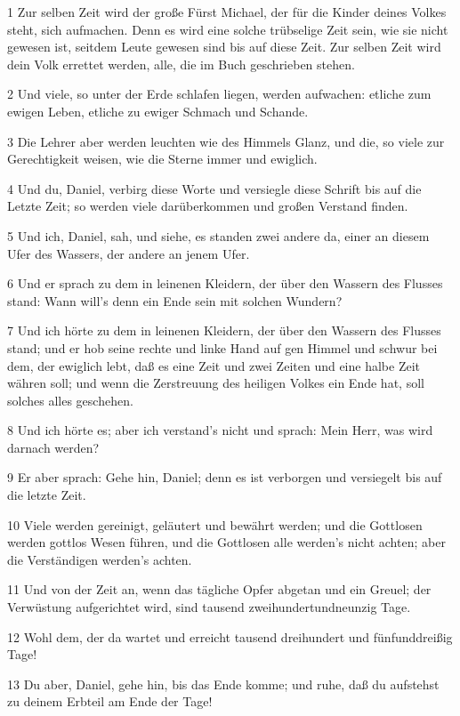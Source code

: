 \par 1 Zur selben Zeit wird der große Fürst Michael, der für die Kinder deines Volkes steht, sich aufmachen. Denn es wird eine solche trübselige Zeit sein, wie sie nicht gewesen ist, seitdem Leute gewesen sind bis auf diese Zeit. Zur selben Zeit wird dein Volk errettet werden, alle, die im Buch geschrieben stehen.
\par 2 Und viele, so unter der Erde schlafen liegen, werden aufwachen: etliche zum ewigen Leben, etliche zu ewiger Schmach und Schande.
\par 3 Die Lehrer aber werden leuchten wie des Himmels Glanz, und die, so viele zur Gerechtigkeit weisen, wie die Sterne immer und ewiglich.
\par 4 Und du, Daniel, verbirg diese Worte und versiegle diese Schrift bis auf die Letzte Zeit; so werden viele darüberkommen und großen Verstand finden.
\par 5 Und ich, Daniel, sah, und siehe, es standen zwei andere da, einer an diesem Ufer des Wassers, der andere an jenem Ufer.
\par 6 Und er sprach zu dem in leinenen Kleidern, der über den Wassern des Flusses stand: Wann will's denn ein Ende sein mit solchen Wundern?
\par 7 Und ich hörte zu dem in leinenen Kleidern, der über den Wassern des Flusses stand; und er hob seine rechte und linke Hand auf gen Himmel und schwur bei dem, der ewiglich lebt, daß es eine Zeit und zwei Zeiten und eine halbe Zeit währen soll; und wenn die Zerstreuung des heiligen Volkes ein Ende hat, soll solches alles geschehen.
\par 8 Und ich hörte es; aber ich verstand's nicht und sprach: Mein Herr, was wird darnach werden?
\par 9 Er aber sprach: Gehe hin, Daniel; denn es ist verborgen und versiegelt bis auf die letzte Zeit.
\par 10 Viele werden gereinigt, geläutert und bewährt werden; und die Gottlosen werden gottlos Wesen führen, und die Gottlosen alle werden's nicht achten; aber die Verständigen werden's achten.
\par 11 Und von der Zeit an, wenn das tägliche Opfer abgetan und ein Greuel; der Verwüstung aufgerichtet wird, sind tausend zweihundertundneunzig Tage.
\par 12 Wohl dem, der da wartet und erreicht tausend dreihundert und fünfunddreißig Tage!
\par 13 Du aber, Daniel, gehe hin, bis das Ende komme; und ruhe, daß du aufstehst zu deinem Erbteil am Ende der Tage!

